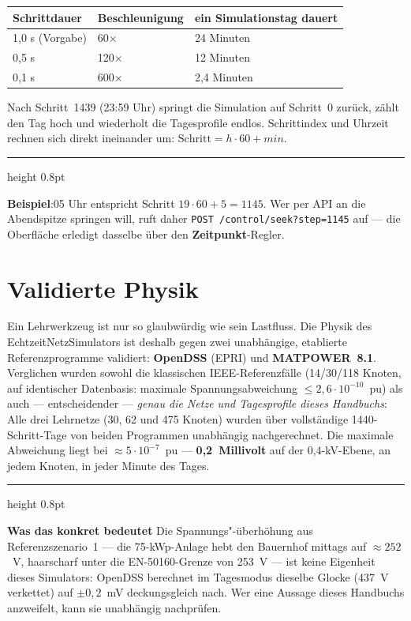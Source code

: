 \documentclass[11pt,a4paper,parskip=half]{scrreprt}
\newcommand{\ui}[1]{\textsf{\bfseries #1}}          %
\newcommand{\api}[1]{\texttt{#1}}                    %
\newenvironment{beispiel}[1][Beispiel]
  {\par\medskip
   {\color{bsp}\hrule height 0.8pt}\nopagebreak\smallskip
   \noindent\textbf{\textsf{\textcolor{bsp}{#1}}}\quad\ignorespaces}
  {\par\nopagebreak\smallskip{\color{bsp}\hrule height 0.8pt}\par\medskip}
\begin{document}
\begin{center}
\begin{tabular}{@{}lll@{}}
\toprule
Schrittdauer & Beschleunigung & ein Simulationstag dauert \\
\midrule
1{,}0 s (Vorgabe) & 60$\times$ & 24 Minuten \\
0{,}5 s & 120$\times$ & 12 Minuten \\
0{,}1 s & 600$\times$ & 2{,}4 Minuten \\
\bottomrule
\end{tabular}
\end{center}

Nach Schritt~1439 (23:59 Uhr) springt die Simulation auf Schritt~0
zurück, zählt den Tag hoch und wiederholt die Tagesprofile endlos.
Schrittindex und Uhrzeit rechnen sich direkt ineinander um:
$\text{Schritt} = h \cdot 60 + min$.

\begin{beispiel}
19:05 Uhr entspricht Schritt $19 \cdot 60 + 5 = 1145$. Wer per API an
die Abendspitze springen will, ruft daher
\api{POST /control/seek?step=1145} auf --- die Oberfläche erledigt
dasselbe über den \ui{Zeitpunkt}-Regler.
\end{beispiel}

\section{Validierte Physik}
\label{sec:validierung}

Ein Lehrwerkzeug ist nur so glaubwürdig wie sein Lastfluss. Die
Physik des EchtzeitNetzSimulators ist deshalb gegen zwei unabhängige,
etablierte Referenzprogramme validiert: \textbf{OpenDSS} (EPRI) und
\textbf{MATPOWER~8.1}. Verglichen wurden sowohl die klassischen
IEEE-Referenzfälle (14/30/118 Knoten, auf identischer Datenbasis:
maximale Spannungsabweichung $\le 2{,}6\cdot10^{-10}$~pu) als auch
--- entscheidender --- \emph{genau die Netze und Tagesprofile dieses
Handbuchs}: Alle drei Lehrnetze (30, 62 und 475 Knoten) wurden über
vollständige 1440-Schritt-Tage von beiden Programmen unabhängig
nachgerechnet. Die maximale Abweichung liegt bei
$\approx 5\cdot10^{-7}$~pu --- \textbf{0{,}2~Millivolt} auf der
0,4-kV-Ebene, an jedem Knoten, in jeder Minute des Tages.

\begin{beispiel}[Was das konkret bedeutet]
Die Spannungs"-überhöhung aus Referenzszenario~1 --- die
75-kWp-Anlage hebt den Bauernhof mittags auf $\approx 252$~V, haarscharf
unter die EN-50160-Grenze von 253~V --- ist keine Eigenheit dieses
Simulators: OpenDSS berechnet im Tagesmodus dieselbe Glocke
(437~V verkettet) auf $\pm 0{,}2$~mV deckungsgleich nach. Wer eine
Aussage dieses Handbuchs anzweifelt, kann sie unabhängig nachprüfen.
\end{beispiel}
\end{document}
